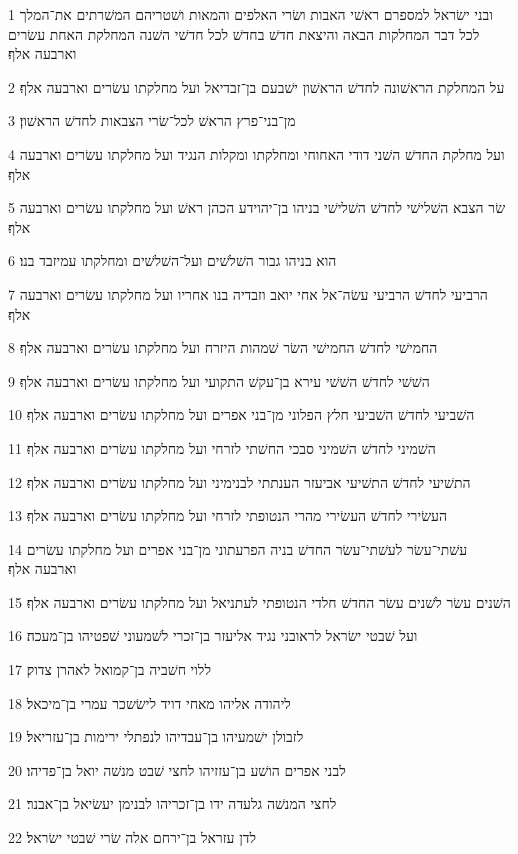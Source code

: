 \par 1 ובני ישׂראל למספרם ראשׁי האבות ושׂרי האלפים והמאות ושׁטריהם המשׁרתים את־המלך לכל דבר המחלקות הבאה והיצאת חדשׁ בחדשׁ לכל חדשׁי השׁנה המחלקת האחת עשׂרים וארבעה אלף׃
\par 2 על המחלקת הראשׁונה לחדשׁ הראשׁון ישׁבעם בן־זבדיאל ועל מחלקתו עשׂרים וארבעה אלף׃
\par 3 מן־בני־פרץ הראשׁ לכל־שׂרי הצבאות לחדשׁ הראשׁון׃
\par 4 ועל מחלקת החדשׁ השׁני דודי האחוחי ומחלקתו ומקלות הנגיד ועל מחלקתו עשׂרים וארבעה אלף׃
\par 5 שׂר הצבא השׁלישׁי לחדשׁ השׁלישׁי בניהו בן־יהוידע הכהן ראשׁ ועל מחלקתו עשׂרים וארבעה אלף׃
\par 6 הוא בניהו גבור השׁלשׁים ועל־השׁלשׁים ומחלקתו עמיזבד בנו׃
\par 7 הרביעי לחדשׁ הרביעי עשׂה־אל אחי יואב וזבדיה בנו אחריו ועל מחלקתו עשׂרים וארבעה אלף׃
\par 8 החמישׁי לחדשׁ החמישׁי השׂר שׁמהות היזרח ועל מחלקתו עשׂרים וארבעה אלף׃
\par 9 השׁשׁי לחדשׁ השׁשׁי עירא בן־עקשׁ התקועי ועל מחלקתו עשׂרים וארבעה אלף׃
\par 10 השׁביעי לחדשׁ השׁביעי חלץ הפלוני מן־בני אפרים ועל מחלקתו עשׂרים וארבעה אלף׃
\par 11 השׁמיני לחדשׁ השׁמיני סבכי החשׁתי לזרחי ועל מחלקתו עשׂרים וארבעה אלף׃
\par 12 התשׁיעי לחדשׁ התשׁיעי אביעזר הענתתי לבנימיני ועל מחלקתו עשׂרים וארבעה אלף׃
\par 13 העשׂירי לחדשׁ העשׂירי מהרי הנטופתי לזרחי ועל מחלקתו עשׂרים וארבעה אלף׃
\par 14 עשׁתי־עשׂר לעשׁתי־עשׂר החדשׁ בניה הפרעתוני מן־בני אפרים ועל מחלקתו עשׂרים וארבעה אלף׃
\par 15 השׁנים עשׂר לשׁנים עשׂר החדשׁ חלדי הנטופתי לעתניאל ועל מחלקתו עשׂרים וארבעה אלף׃
\par 16 ועל שׁבטי ישׂראל לראובני נגיד אליעזר בן־זכרי לשׁמעוני שׁפטיהו בן־מעכה׃
\par 17 ללוי חשׁביה בן־קמואל לאהרן צדוק׃
\par 18 ליהודה אליהו מאחי דויד לישׂשכר עמרי בן־מיכאל׃
\par 19 לזבולן ישׁמעיהו בן־עבדיהו לנפתלי ירימות בן־עזריאל׃
\par 20 לבני אפרים הושׁע בן־עזזיהו לחצי שׁבט מנשׁה יואל בן־פדיהו׃
\par 21 לחצי המנשׁה גלעדה ידו בן־זכריהו לבנימן יעשׂיאל בן־אבנר׃
\par 22 לדן עזראל בן־ירחם אלה שׂרי שׁבטי ישׂראל׃
